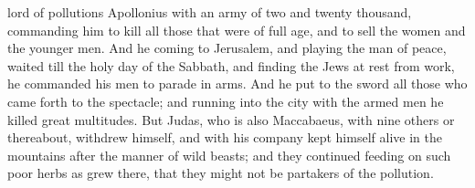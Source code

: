 { lord of pollutions Apollonius with an army of two and twenty thousand, commanding him to kill all those that were of full age, and to sell the women and the younger men.
And he coming to Jerusalem, and playing the man of peace, waited till the holy day of the Sabbath, and finding the Jews at rest from work, he commanded his men to parade in arms.
And he put to the sword all those who came forth to the spectacle; and running into the city with the armed men he killed great multitudes.
But Judas, who is also
{} Maccabaeus, with nine others or thereabout, withdrew himself, and with his company kept himself alive in the mountains after the manner of wild beasts; and they continued feeding on
 such poor herbs as grew there, that they might not be partakers of the
{} pollution.

}
